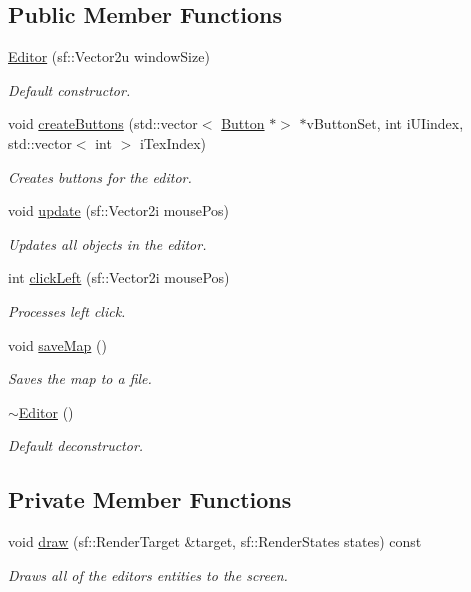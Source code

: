 \subsection*{Public Member Functions}
\begin{DoxyCompactItemize}
\item 
\hyperlink{class_editor_a45bf02bd66bfc07f02036d1bcad60771}{Editor} (sf\+::\+Vector2u window\+Size)
\begin{DoxyCompactList}\small\item\em Default constructor. \end{DoxyCompactList}\item 
void \hyperlink{class_editor_ab3a445fd47d3eb0ff5abcbb6707dea5c}{create\+Buttons} (std\+::vector$<$ \hyperlink{class_button}{Button} $\ast$$>$ $\ast$v\+Button\+Set, int i\+U\+Iindex, std\+::vector$<$ int $>$ i\+Tex\+Index)
\begin{DoxyCompactList}\small\item\em Creates buttons for the editor. \end{DoxyCompactList}\item 
void \hyperlink{class_editor_aa2bc683d68f5df26779d90322b7b52b4}{update} (sf\+::\+Vector2i mouse\+Pos)
\begin{DoxyCompactList}\small\item\em Updates all objects in the editor. \end{DoxyCompactList}\item 
int \hyperlink{class_editor_abb3e1cbf4e8b75f7550e45bfb3cc766a}{click\+Left} (sf\+::\+Vector2i mouse\+Pos)
\begin{DoxyCompactList}\small\item\em Processes left click. \end{DoxyCompactList}\item 
void \hyperlink{class_editor_add1f4b900d9c8ae6065ccd769929b617}{save\+Map} ()
\begin{DoxyCompactList}\small\item\em Saves the map to a file. \end{DoxyCompactList}\item 
\hyperlink{class_editor_ad465abc9575af92b4fa61525085172d6}{$\sim$\+Editor} ()
\begin{DoxyCompactList}\small\item\em Default deconstructor. \end{DoxyCompactList}\end{DoxyCompactItemize}
\subsection*{Private Member Functions}
\begin{DoxyCompactItemize}
\item 
void \hyperlink{class_editor_a7b06e5a217370227a79e660b113dde24}{draw} (sf\+::\+Render\+Target \&target, sf\+::\+Render\+States states) const
\begin{DoxyCompactList}\small\item\em Draws all of the editor\textquotesingle{}s entities to the screen. \end{DoxyCompactList}\end{DoxyCompactItemize}
